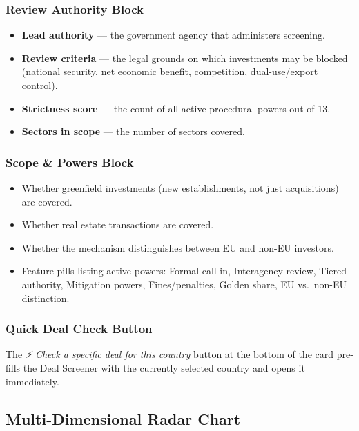 \documentclass[12pt,a4paper]{article}
\newcommand{\uielem}[1]{\textit{#1}}
\begin{document}
\subsubsection{Review Authority Block}

\begin{itemize}
  \item \textbf{Lead authority} — the government agency that administers screening.
  \item \textbf{Review criteria} — the legal grounds on which investments may be blocked (national security, net economic benefit, competition, dual-use/export control).
  \item \textbf{Strictness score} — the count of all active procedural powers out of 13.
  \item \textbf{Sectors in scope} — the number of sectors covered.
\end{itemize}

\subsubsection{Scope \& Powers Block}

\begin{itemize}
  \item Whether greenfield investments (new establishments, not just acquisitions) are covered.
  \item Whether real estate transactions are covered.
  \item Whether the mechanism distinguishes between EU and non-EU investors.
  \item Feature pills listing active powers: Formal call-in, Interagency review, Tiered authority, Mitigation powers, Fines/penalties, Golden share, EU vs.\ non-EU distinction.
\end{itemize}

\subsubsection{Quick Deal Check Button}

The \uielem{⚡ Check a specific deal for this country} button at the bottom of the card pre-fills the Deal Screener with the currently selected country and opens it immediately.

\subsection{Multi-Dimensional Radar Chart}
\end{document}
